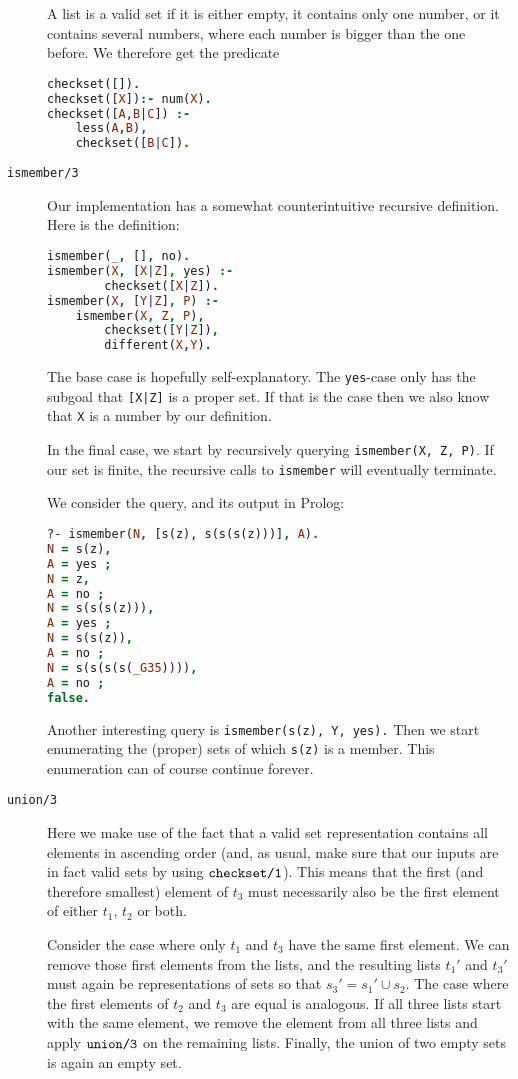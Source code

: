 \documentclass[a4paper]{article}
\newcommand{\pfunc}[1]{\textnormal{\texttt{#1}}\xspace}
\newcommand{\pfuncn}[2]{\textnormal{\texttt{#1/#2}}\xspace}
\newcommand{\plVar}[1]{\texttt{#1}\xspace}
\begin{document}
\begin{description}
A list is a valid set if it is either empty, it contains only one number, or it contains several numbers, where each number is bigger than the one before.  We therefore get the predicate 
\begin{lstlisting}[language=prolog]
checkset([]).
checkset([X]):- num(X).
checkset([A,B|C]) :- 
	less(A,B), 
	checkset([B|C]).
\end{lstlisting}
\item[\pfuncn{ismember}{3}] Our implementation has a somewhat counterintuitive recursive definition. Here is the definition:
  \begin{lstlisting}[language=prolog]
ismember(_, [], no).
ismember(X, [X|Z], yes) :-
        checkset([X|Z]).
ismember(X, [Y|Z], P) :-
	ismember(X, Z, P),
        checkset([Y|Z]),
        different(X,Y).
\end{lstlisting}
The base case is hopefully self-explanatory. The \texttt{yes}-case only has the subgoal that \texttt{[X|Z]} is a proper set. If that is the case then we also know that \plVar{X} is a number by our definition.

In the final case, we start by recursively querying \texttt{ismember(X, Z, P)}. If our set is finite, the recursive calls to \pfunc{ismember} will eventually terminate. 


  We consider the query, and its output in Prolog:
\begin{lstlisting}[language=prolog]
?- ismember(N, [s(z), s(s(s(z)))], A).
N = s(z),
A = yes ;
N = z,
A = no ;
N = s(s(s(z))),
A = yes ;
N = s(s(z)),
A = no ;
N = s(s(s(s(_G35)))),
A = no ;
false.
\end{lstlisting}
Another interesting query is \texttt{ismember(s(z), Y, yes).} Then we start enumerating the (proper) sets of which \plVar{s(z)} is a member. This enumeration can of course continue forever.

\item[\pfuncn{union}{3}] Here we make use of the fact that a valid set representation contains all elements in ascending order (and, as usual, make sure that our inputs are in fact valid sets by using $\pfuncn{checkset}{1}$). This means that the first (and therefore smallest) element of $t_3$ must necessarily also be the first element of either $t_1$, $t_2$ or both. 

Consider the case where only $t_1$ and $t_3$ have the same first element. We can remove those first elements from the lists, and the resulting lists $t_1'$ and $t_3'$ must again be representations of sets so that $s_3' = s_1' \cup s_2$. The case where the first elements of $t_2$ and $t_3$ are equal is analogous. If all three lists start with the same element, we remove the element from all three lists and apply $\pfuncn{union}{3}$ on the remaining lists. Finally, the union of two empty sets is again an empty set. 
  

\end{description}
\end{document}
